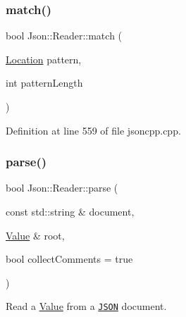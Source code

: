 \subsubsection{\texorpdfstring{match()}{match()}\hspace{0.1cm}{\footnotesize\ttfamily [2/2]}}
{\footnotesize\ttfamily bool Json\+::\+Reader\+::match (\begin{DoxyParamCaption}\item[{\hyperlink{class_json_1_1_reader_a46795b5b272bf79a7730e406cb96375a}{Location}}]{pattern,  }\item[{int}]{pattern\+Length }\end{DoxyParamCaption})\hspace{0.3cm}{\ttfamily [private]}}



Definition at line 559 of file jsoncpp.\+cpp.

\hypertarget{class_json_1_1_reader_af1da6c976ad1e96c742804c3853eef94}{}\label{class_json_1_1_reader_af1da6c976ad1e96c742804c3853eef94} 
\subsubsection{\texorpdfstring{parse()}{parse()}\hspace{0.1cm}{\footnotesize\ttfamily [1/6]}}
{\footnotesize\ttfamily bool Json\+::\+Reader\+::parse (\begin{DoxyParamCaption}\item[{const std\+::string \&}]{document,  }\item[{\hyperlink{class_json_1_1_value}{Value} \&}]{root,  }\item[{bool}]{collect\+Comments = {\ttfamily true} }\end{DoxyParamCaption})}



Read a \hyperlink{class_json_1_1_value}{Value} from a \href{http://www.json.org}{\tt J\+S\+ON} document. 



